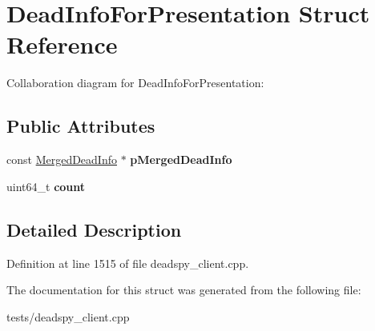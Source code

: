 \hypertarget{structDeadInfoForPresentation}{\section{Dead\-Info\-For\-Presentation Struct Reference}
\label{structDeadInfoForPresentation}
}


Collaboration diagram for Dead\-Info\-For\-Presentation\-:
\subsection*{Public Attributes}
\begin{DoxyCompactItemize}
\item 
\hypertarget{structDeadInfoForPresentation_a78810a52fe1ac7c495d5e81dd915b81d}{const \hyperlink{structMergedDeadInfo}{Merged\-Dead\-Info} $\ast$ {\bfseries p\-Merged\-Dead\-Info}}\label{structDeadInfoForPresentation_a78810a52fe1ac7c495d5e81dd915b81d}

\item 
\hypertarget{structDeadInfoForPresentation_a1e4f6bc81f3cb8c969f4443689af57b8}{uint64\-\_\-t {\bfseries count}}\label{structDeadInfoForPresentation_a1e4f6bc81f3cb8c969f4443689af57b8}

\end{DoxyCompactItemize}


\subsection{Detailed Description}


Definition at line 1515 of file deadspy\-\_\-client.\-cpp.



The documentation for this struct was generated from the following file\-:\begin{DoxyCompactItemize}
\item 
tests/deadspy\-\_\-client.\-cpp\end{DoxyCompactItemize}
